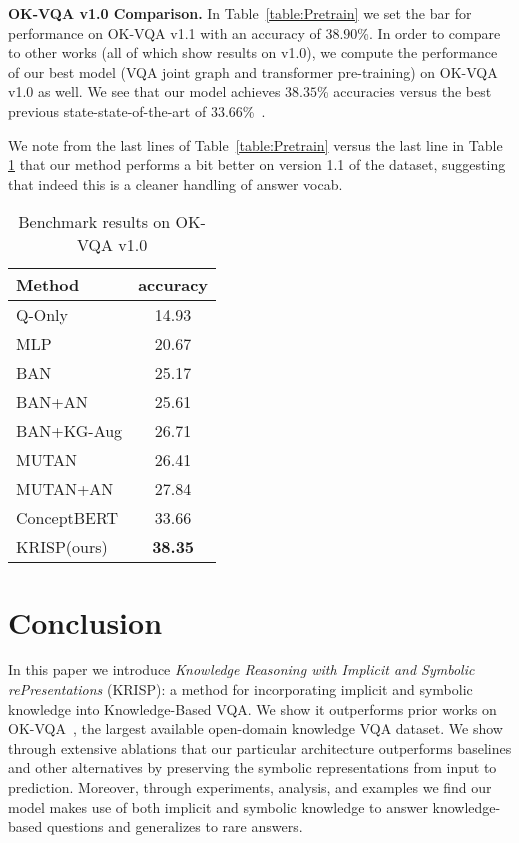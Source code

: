 \documentclass[final]{cvpr}
\providecommand{\ModelName}{KRISP\xspace}
\providecommand{\ModelNameLong}{Knowledge Reasoning with Implicit and  Symbolic rePresentations\xspace}
\providecommand{\myparagraph}[1]{\noindent\textbf{#1.}}
\providecommand{\sectionvspace}{\vspace{-0cm}}
\begin{document}
\myparagraph{OK-VQA v1.0 Comparison}
In Table~\ref{table:Pretrain} we set the bar for performance on OK-VQA v1.1 with an accuracy of $38.90$\%. In order to compare to other works (all of which show results on v1.0), we compute the performance of our best model (VQA joint graph and transformer pre-training) on OK-VQA v1.0 as well. We see that our model achieves $38.35$\% accuracies versus the best previous state-state-of-the-art of $33.66$\%~\cite{garderes2020conceptbert}.

We note from the last lines of Table~\ref{table:Pretrain} versus the last line in Table \ref{table:OKVQA} that our method performs a bit better on version 1.1 of the dataset, suggesting that indeed this is a cleaner handling of answer vocab.


\begin{table}[t]
\begin{center}
\begin{tabular}{@{}lc@{}}
\toprule
Method & accuracy\\ \midrule
Q-Only & 14.93 \\
MLP & 20.67  \\
BAN \cite{kim2018bilinear} & 25.17 \\
BAN+AN \cite{marino19cvpr} & 25.61 \\
BAN+KG-Aug \cite{guohao20mm} & 26.71 \\
MUTAN \cite{ben2017mutan} & 26.41 \\
MUTAN+AN \cite{marino19cvpr} & 27.84  \\
ConceptBERT \cite{garderes2020conceptbert} & 33.66 \\
\ModelName (ours) & \textbf{38.35} \\
\bottomrule
\end{tabular}
\end{center}
\caption{Benchmark results on OK-VQA v1.0}
\label{table:OKVQA}
\vspace{-.3cm}
\end{table}

\sectionvspace
\section{Conclusion}
\sectionvspace
In this paper we introduce \emph{\ModelNameLong} (\ModelName): a method for incorporating implicit and symbolic knowledge into Knowledge-Based VQA. We show it outperforms prior works on OK-VQA~\cite{marino19cvpr}, the largest available open-domain knowledge VQA dataset. We show through extensive ablations that our particular architecture outperforms baselines and other alternatives by preserving the symbolic representations from input to prediction. Moreover, through experiments, analysis, and examples we find our model makes use of both implicit and symbolic knowledge to answer knowledge-based questions and generalizes to rare answers.
\end{document}
